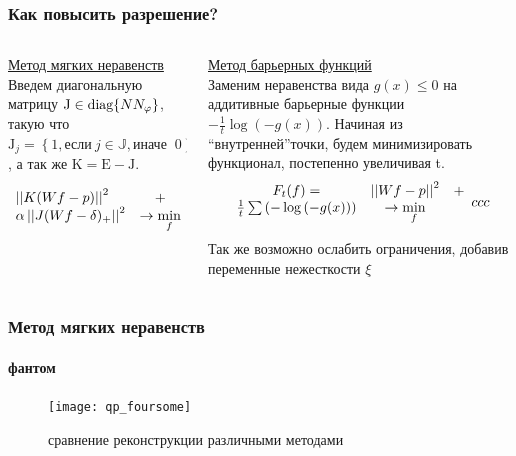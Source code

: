 \begingroup
\small
\begin{frame}
  \frametitle{Как повысить разрешение?}
  \begin{columns}[T, onlytextwidth]
  \hspace{-0.5cm}
  \begin{column}{0.5\textwidth}
    \underline{Метод мягких неравенств} \\ \vspace{0.5cm}
    Введем диагональную матрицу $\mathrm J \in \textup{diag}\{N N_\varphi\}$, такую что 
    $\mathrm J_{j} = \left\{1, \mbox{если}\ j \in \mathbb J, \mbox{иначе }\ 0\right\}$, а так же $\mathrm K = \mathrm E - \mathrm J$.


    \begin{equation} \notag
      \label{eq:soft-ineq}
      \begin{array}{lc}
      \left|\left| K(Wf - p) \right|\right|^2 & + \\
      \alpha \left|\left| J(Wf - \delta)_{+} \right|\right|^2  & \to \min\limits_f
      \end{array}
    \end{equation}
  \end{column}

  \begin{column}{0.5\textwidth}
    \underline{Метод барьерных функций} \\ \vspace{0.5cm}
    Заменим неравенства вида $g(x) \leq 0$ на аддитивные барьерные функции $-\frac 1 t \log{\left(-g(x)\right)}$.
    Начиная из ``внутренней''точки, будем минимизировать функционал, постепенно увеличивая t.
    $$
    \begin{array}{ccc}
      F_t(f) = & \left|\left| Wf - p \right|\right|^2 & + \\
     \frac 1 t \sum \left( -\log{\left(-g(x)\right)} \right) &\to \min\limits_f &
    \end{array}{ccc}
    $$

    Так же возможно ослабить ограничения, добавив переменные нежесткости $\xi$

  \end{column}
  \end{columns}
\end{frame}
\endgroup

\begin{frame}
\frametitle{Метод мягких неравенств}
\framesubtitle{фантом}

\begin{figure}
  \centering
  \vspace{-0.3cm}
  \texttt{[image: qp\_foursome]}
  \caption{сравнение реконструкции различными методами}
  \label{fig:sample}
\end{figure}

\end{frame}



